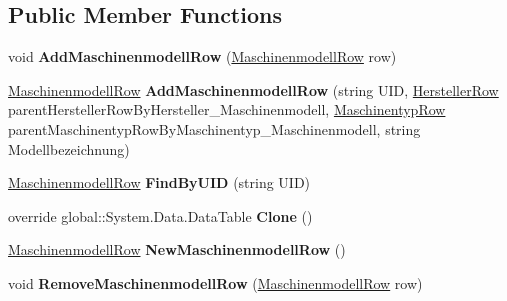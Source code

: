 \subsection*{Public Member Functions}
\begin{DoxyCompactItemize}
\item 
void {\bfseries Add\+Maschinenmodell\+Row} (\hyperlink{class_products_1_1_data_1_1ds_sage_1_1_maschinenmodell_row}{Maschinenmodell\+Row} row)\hypertarget{class_products_1_1_data_1_1ds_sage_1_1_maschinenmodell_data_table_aa378cf36fe642a673bdcea9823fe9763}{}\label{class_products_1_1_data_1_1ds_sage_1_1_maschinenmodell_data_table_aa378cf36fe642a673bdcea9823fe9763}

\item 
\hyperlink{class_products_1_1_data_1_1ds_sage_1_1_maschinenmodell_row}{Maschinenmodell\+Row} {\bfseries Add\+Maschinenmodell\+Row} (string U\+ID, \hyperlink{class_products_1_1_data_1_1ds_sage_1_1_hersteller_row}{Hersteller\+Row} parent\+Hersteller\+Row\+By\+Hersteller\+\_\+\+Maschinenmodell, \hyperlink{class_products_1_1_data_1_1ds_sage_1_1_maschinentyp_row}{Maschinentyp\+Row} parent\+Maschinentyp\+Row\+By\+Maschinentyp\+\_\+\+Maschinenmodell, string Modellbezeichnung)\hypertarget{class_products_1_1_data_1_1ds_sage_1_1_maschinenmodell_data_table_a8ce03685a98ea369277c638403dda123}{}\label{class_products_1_1_data_1_1ds_sage_1_1_maschinenmodell_data_table_a8ce03685a98ea369277c638403dda123}

\item 
\hyperlink{class_products_1_1_data_1_1ds_sage_1_1_maschinenmodell_row}{Maschinenmodell\+Row} {\bfseries Find\+By\+U\+ID} (string U\+ID)\hypertarget{class_products_1_1_data_1_1ds_sage_1_1_maschinenmodell_data_table_aa1fd106b98d46717ec4d1c6c319f4dfb}{}\label{class_products_1_1_data_1_1ds_sage_1_1_maschinenmodell_data_table_aa1fd106b98d46717ec4d1c6c319f4dfb}

\item 
override global\+::\+System.\+Data.\+Data\+Table {\bfseries Clone} ()\hypertarget{class_products_1_1_data_1_1ds_sage_1_1_maschinenmodell_data_table_a776a1ccb22ceaed9fac13b763bde13ba}{}\label{class_products_1_1_data_1_1ds_sage_1_1_maschinenmodell_data_table_a776a1ccb22ceaed9fac13b763bde13ba}

\item 
\hyperlink{class_products_1_1_data_1_1ds_sage_1_1_maschinenmodell_row}{Maschinenmodell\+Row} {\bfseries New\+Maschinenmodell\+Row} ()\hypertarget{class_products_1_1_data_1_1ds_sage_1_1_maschinenmodell_data_table_a5ad96de9eb82b8b5c416a368c06f6912}{}\label{class_products_1_1_data_1_1ds_sage_1_1_maschinenmodell_data_table_a5ad96de9eb82b8b5c416a368c06f6912}

\item 
void {\bfseries Remove\+Maschinenmodell\+Row} (\hyperlink{class_products_1_1_data_1_1ds_sage_1_1_maschinenmodell_row}{Maschinenmodell\+Row} row)\hypertarget{class_products_1_1_data_1_1ds_sage_1_1_maschinenmodell_data_table_a8df800f9319229464bd6fa19bb645611}{}\label{class_products_1_1_data_1_1ds_sage_1_1_maschinenmodell_data_table_a8df800f9319229464bd6fa19bb645611}

\end{DoxyCompactItemize}
